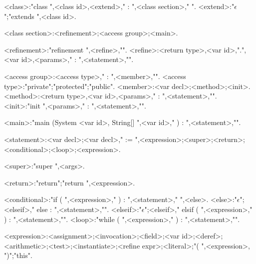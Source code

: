 \begin{grammar}

<class>:"class ",<class id>,<extend>," : ",<class section>,"{\small *} ".
<extend>:"$\epsilon$";"extends ",<class id>.

<class section>:<refinement>;<access group>;<main>.

<refinement>:"refinement ",<refine>,"{\small *}".
<refine>:<return type>,<var id>,".",<var id>,<params>," : ",<statement>,"{\small *}".

<access group>:<access type>," : ",<member>,"{\small *}".
<access type>:"private";"protected";"public".
<member>:<var decl>;<method>;<init>.
<method>:<return type>,<var id>,<params>," : ",<statement>,"{\small *}".
<init>:"init ",<params>," : ",<statement>,"{\small *}".

<main>:"main (System <var id>, String[] ",<var id>," ) : ",<statement>,"{\small *}".

<statement>:<var decl>;<var decl>," := ",<expression>;<super>;<return>;<conditional>;<loop>;<expression>.

<super>:"super ",<args>.

<return>:"return";"return ",<expression>.

<conditional>:"if ( ",<expression>," ) :  ",<statement>,"{\small *} ",<else>.
<else>:"$\epsilon$";<elseif>," else : ",<statement>,"{\small *}".
<elseif>:"$\epsilon$";<elseif>," elsif ( ",<expression>," ) : ",<statement>,"{\small *}".
<loop>:"while ( ",<expression>," ) : ",<statement>,"{\small *}".

<expression>:<assignment>;<invocation>;<field>;<var id>;<deref>;<arithmetic>;<test>;<instantiate>;<refine expr>;<literal>;"( ",<expression>, ")";"this".


\end{grammar}
